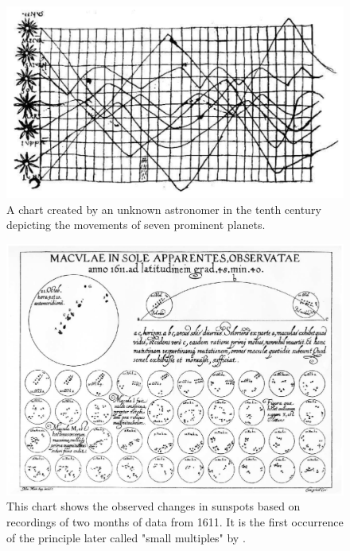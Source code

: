 \begin{figure}[tp]
\centering
\includegraphics[keepaspectratio,width=\linewidth,height=\fullh / 3]{images/planetary-movements.png}
\caption[Chart of Planetary Movements from the Tenth Century]{
  A chart created by an unknown astronomer in the tenth century depicting the movements of seven prominent planets.
}
\label{fig:PlanetaryMovements}
\end{figure}

\begin{figure}[tp]
\centering
\includegraphics[keepaspectratio,width=\linewidth,height=\fullh / 3]{images/sunspot-changes.png}
\caption[Chart of Changes in Sunspots from 1626]{
  This chart shows the observed changes in sunspots based on recordings of two months of data from 1611.
  It is the first occurrence of the principle later called "small multiples" by \textcite{VisualDisplayOfQuantitativeInformation}.
}
\label{fig:SunspotChanges}
\end{figure}


